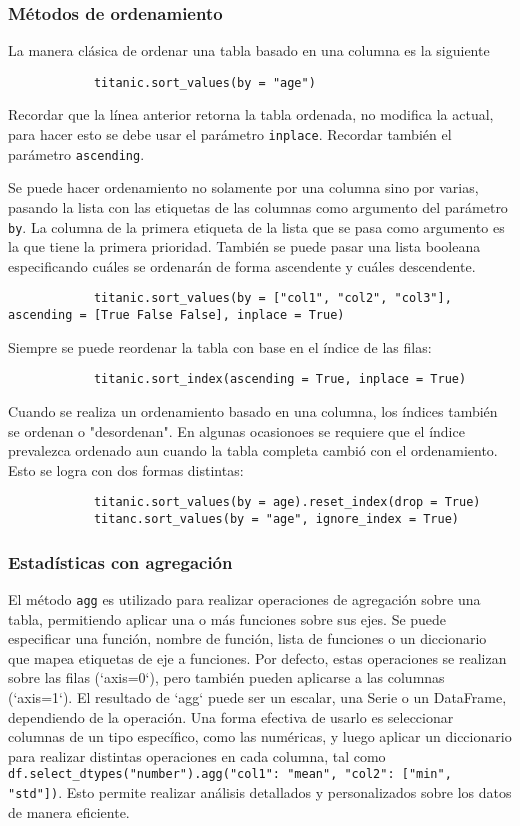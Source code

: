\subsubsection{Métodos de ordenamiento}

\noindent La manera clásica de ordenar una tabla basado en una columna es la
siguiente
\begin{verbatim}
            titanic.sort_values(by = "age")
            \end{verbatim}
Recordar que la línea anterior retorna la tabla ordenada, no modifica la
actual, para hacer esto se debe usar el parámetro \texttt{inplace}. Recordar
también el parámetro \texttt{ascending}.

\noindent Se puede hacer ordenamiento no solamente por una columna sino por
varias, pasando la lista con las etiquetas de las columnas como argumento del
parámetro \texttt{by}. La columna de la primera etiqueta de la lista que se
pasa como argumento es la que tiene la primera prioridad. También se puede
pasar una lista booleana especificando cuáles se ordenarán de forma ascendente
y cuáles descendente.
\begin{verbatim}
            titanic.sort_values(by = ["col1", "col2", "col3"], ascending = [True False False], inplace = True)
            \end{verbatim}
\noindent Siempre se puede reordenar la tabla con base en el índice de las
filas:
\begin{verbatim}
            titanic.sort_index(ascending = True, inplace = True)
            \end{verbatim}
Cuando se realiza un ordenamiento basado en una columna, los índices también se
ordenan o "desordenan". En algunas ocasionoes se requiere que el índice
prevalezca ordenado aun cuando la tabla completa cambió con el ordenamiento.
Esto se logra con dos formas distintas:
\begin{verbatim}
            titanic.sort_values(by = age).reset_index(drop = True)
            titanc.sort_values(by = "age", ignore_index = True)
            \end{verbatim}

\subsubsection{Estadísticas con agregación}

El método \texttt{agg} es utilizado para realizar operaciones de agregación
sobre una tabla, permitiendo aplicar una o más funciones sobre sus ejes. Se
puede especificar una función, nombre de función, lista de funciones o un
diccionario que mapea etiquetas de eje a funciones. Por defecto, estas
operaciones se realizan sobre las filas (`axis=0`), pero también pueden
aplicarse a las columnas (`axis=1`). El resultado de `agg` puede ser un
escalar, una Serie o un DataFrame, dependiendo de la operación. Una forma
efectiva de usarlo es seleccionar columnas de un tipo específico, como las
numéricas, y luego aplicar un diccionario para realizar distintas operaciones
en cada columna, tal como \texttt{df.select\_dtypes("number").agg({"col1":
"mean", "col2": ["min", "std"]})}. Esto permite realizar análisis detallados y
personalizados sobre los datos de manera eficiente.

